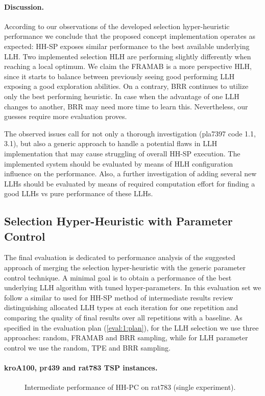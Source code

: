 \paragraph{Discussion.} According to our observations of the developed selection hyper-heuristic performance we conclude that the proposed concept implementation operates as expected: HH-SP exposes similar performance to the best available underlying LLH. Two implemented selection HLH are performing slightly differently when reaching a local optimum. We claim the FRAMAB is a more perspective HLH, since it starts to balance between previously seeing good performing LLH exposing a good exploration abilities. On a contrary, BRR continues to utilize only the best performing heuristic. In case when the advantage of one LLH changes to another, BRR may need more time to learn this. Nevertheless, our guesses require more evaluation proves.

The observed issues call for not only a thorough investigation (pla7397 code 1.1, 3.1), but also a generic approach to handle a potential flaws in LLH implementation that may cause struggling of overall HH-SP execution. The implemented system should be evaluated by means of HLH configuration influence on the performance. Also, a further investigation of adding several new LLHs should be evaluated by means of required computation effort for finding a good LLHs vs pure performance of these LLHs.


\subsection{Selection Hyper-Heuristic with Parameter Control}\label{eval:1:hh-pc}
The final evaluation is dedicated to performance analysis of the suggested approach of merging the selection hyper-heuristic with the generic parameter control technique. A minimal goal is to obtain a performance of the best underlying LLH algorithm with tuned hyper-parameters. In this evaluation set we follow a similar to used for HH-SP method of intermediate results review distinguishing allocated LLH types at each iteration for one repetition and comparing the quality of final results over all repetitions with a baseline. As specified in the evaluation plan (\cref{eval:1:plan}), for the LLH selection we use three approaches: random, FRAMAB and BRR sampling, while for LLH parameter control we use the random, TPE and BRR sampling.

\paragraph{kroA100, pr439 and rat783 TSP instances.}
\begin{figure}[t]
	\centering
	\vspace{-20pt}
	
	\caption{Intermediate performance of HH-PC on rat783 (single experiment).}
	\vspace{-5pt}
	\label{eval:pict:hh-pc:rat783 intermediate}
\end{figure}

